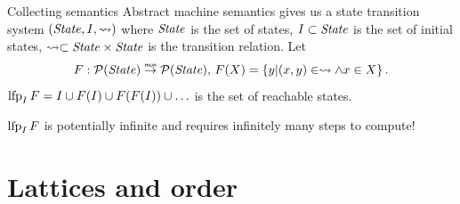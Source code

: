 \documentclass[aspectratio=169]{beamer}
\begin{document}
\begin{frame}{Collecting semantics}
  Abstract machine semantics gives us a state transition system $(\mathit{State}, I, \rightsquigarrow)$ where \pause $\mathit{State}$ is the set of states, \pause $I \subset \mathit{State}$ is the set of initial states, \pause $\rightsquigarrow \subset \mathit{State} \times \mathit{State}$ is the transition relation. \pause Let
  \[ F : \pw(\State) \monarrow \pw(\State),\, F(X) = \Set{y \vert (x, y) \in \step \wedge x \in X}. \]\pause
  $\operatorname{lfp}_I F = I \cup F(I) \cup F(F(I)) \cup \ldots $ is the set of reachable states.\pause

  \alert{$\operatorname{lfp}_I F$ is potentially infinite and requires infinitely many steps to compute!}
\end{frame}

\section{Lattices and order}
\end{document}
